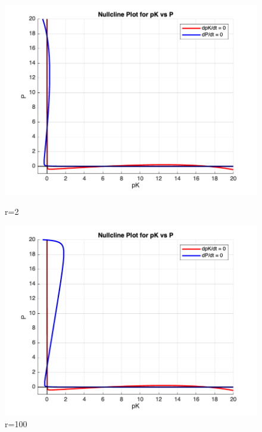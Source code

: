 \documentclass{article}
\begin{document}
\begin{figure}[h]
    \centering
    \begin{minipage}[b]{0.3\textwidth}
        \includegraphics[width=1\textwidth]{plot_ratio=2.png}
        \caption{r=2}
        \label{fig:image1}
    \end{minipage}
    \hfill %
    \begin{minipage}[b]{0.3\textwidth}
        \includegraphics[width=\textwidth]{plot_ratio=100.png}
        \caption{r=100}
        \label{fig:image2}
    \end{minipage}
\end{figure}\\
\end{document}

